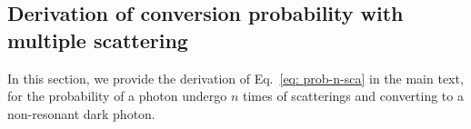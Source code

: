 \documentclass[prd,showpacs,preprintnumbers,amsmath,amssymb,twocolumn,superscriptaddress,notitlepage]{revtex4-2}
\begin{document}
\begin{widetext}




\appendix
\section{Derivation of conversion probability with multiple scattering }
\label{appsec: prob-n derivation}

In this section, we provide the derivation of Eq.~\eqref{eq: prob-n-sca} in the main text, for the probability of a photon undergo $n$ times of scatterings and converting to a non-resonant dark photon.



\end{widetext}
\end{document}
